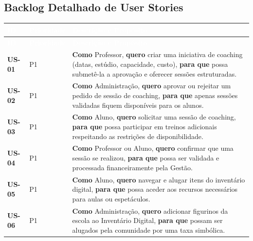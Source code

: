 \documentclass[12pt,a4paper]{report}
\begin{document}
\subsection{Backlog Detalhado de User Stories}

\begin{longtable}{@{}p{} | p{} | p{}@{}}
\toprule
\rowcolor{headerblue}
\textbf{\textcolor{white}{ID}} & \textbf{\textcolor{white}{Prioridade}} & \textbf{\textcolor{white}{Descrição e Propósito}} \\ \midrule
\endfirsthead

\toprule
\rowcolor{headerblue}
\textbf{\textcolor{white}{ID}} & \textbf{\textcolor{white}{Prioridade}} & \textbf{\textcolor{white}{Descrição e Propósito}} \\ \midrule
\endhead

\textbf{US-01} & P1 & \textbf{Como} Professor, \textbf{quero} criar uma iniciativa de coaching (datas, estúdio, capacidade, custo), \textbf{para que} possa submetê-la a aprovação e oferecer sessões estruturadas. \\ \midrule

\textbf{US-02} & P1 & \textbf{Como} Administração, \textbf{quero} aprovar ou rejeitar um pedido de sessão de coaching, \textbf{para que} apenas sessões validadas fiquem disponíveis para os alunos. \\ \midrule

\textbf{US-03} & P1 & \textbf{Como} Aluno, \textbf{quero} solicitar uma sessão de coaching, \textbf{para que} possa participar em treinos adicionais respeitando as restrições de disponibilidade. \\ \midrule

\textbf{US-04} & P1 & \textbf{Como} Professor ou Aluno, \textbf{quero} confirmar que uma sessão se realizou, \textbf{para que} possa ser validada e processada financeiramente pela Gestão. \\ \midrule

\textbf{US-05} & P1 & \textbf{Como} Aluno, \textbf{quero} navegar e alugar itens do inventário digital, \textbf{para que} possa aceder aos recursos necessários para aulas ou espetáculos. \\ \midrule

\textbf{US-06} & P1 & \textbf{Como} Administração, \textbf{quero} adicionar figurinos da escola ao Inventário Digital, \textbf{para que} possam ser alugados pela comunidade por uma taxa simbólica. \\ \midrule


\end{longtable}
\end{document}
